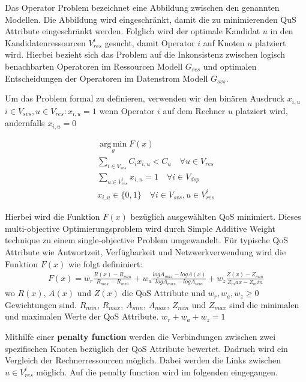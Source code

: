 \documentclass{article}
\begin{document}
Das Operator Problem bezeichnet eine Abbildung zwischen den genannten Modellen. Die Abbildung wird eingeschränkt,
damit die zu minimierenden QuS Attribute eingeschränkt werden. Folglich wird der optimale Kandidat $u$ in den Kandidatenressourcen $V_{res}^i$
gesucht, damit Operator $i$ auf Knoten $u$ platziert wird.
Hierbei bezieht sich das Problem auf die Inkonsistenz zwischen 
logisch benachbarten Operatoren im Ressourcen Modell $G_{res}$ und optimalen Entscheidungen der Operatoren im Datenstrom Modell $G_{svs}$.

Um das Problem formal zu definieren, verwenden wir den binären Ausdruck $x_{i,u}$ $i \in V_{svs}, u \in V_{res}: x_{i,u} = 1$ wenn Operator $i$
auf dem Rechner $u$ platziert wird, andernfalls $x_{i,u} = 0$

\[ 
    \begin{gathered}
        \operatorname*{arg\,min}_\theta F(x) \\
        \sum_{i \in V_{svs}} C_i x_{i,u} < C_u \quad \forall u \in V_{res} \\ %
        \sum_{u \in V_{res}^i} x_{i,u} = 1 \quad \forall i \in V_{dsp} \\ %
        x_{i,u} \in \{0,1\} \quad \forall i \in V_{svs}, u \in V_{res}^i
    \end{gathered}
\] 

Hierbei wird die Funktion $F(x)$ bezüglich ausgewählten QoS minimiert. Dieses multi-objective Optimierungsproblem wird durch 
Simple Additive Weight technique \cite{yoon-multiple-optimization} zu einem single-objective Problem umgewandelt.
Für typische QoS Attribute wie Antwortzeit, Verfügbarkeit und Netzwerkverwendung \cite{k3} wird die Funktion $F(x)$ wie folgt defininiert:
\[ 
    \begin{gathered}
        F(x) = w_r \frac{R(x) - R_{min}}{R_{max} - R_{min}} 
        + w_a \frac{log A_{max} - log A(x)}{log A_{max} - log A_{min}} 
        + w_z \frac{Z(x) - Z_{min}}{Z_max - Z_min} 
    \end{gathered}  \label{to-miminize-function}
\] 
wo $R(x)$, $A(x)$ und $Z(x)$ die QoS Attribute und $w_r, w_a, w_z \geq 0$ Gewichtungen sind. $R_{min}$, $R_{max}$, $A_{min}$, $A_{max}$, $Z_{min}$ und $Z_{max}$ sind die minimalen und maximalen Werte der QoS Attribute.
$w_r + w_a + w_z = 1$




Mithilfe einer \textbf{penalty function} werden die  Verbindungen zwischen zwei spezifischen Knoten bezüglich der QoS Attribute bewertet. Dadruch wird ein Vergleich 
der Rechnerressourcen möglich. Dabei werden die Links zwischen $u \in V_{res}^i$ möglich. Auf die penalty function wird im folgenden eingegangen.
\end{document}
